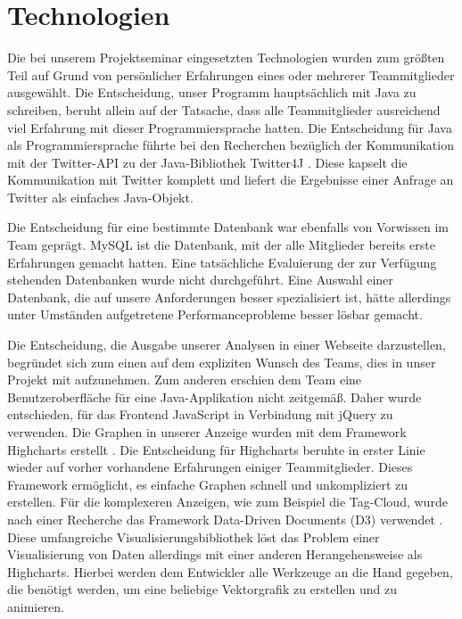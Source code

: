 \section{Technologien}
\label{sec:Tech}
Die bei unserem Projektseminar eingesetzten Technologien wurden zum größten Teil auf Grund von persönlicher Erfahrungen eines oder mehrerer Teammitglieder ausgewählt. Die Entscheidung, unser Programm hauptsächlich mit Java zu schreiben, beruht allein auf der Tatsache, dass alle Teammitglieder ausreichend viel Erfahrung mit dieser Programmiersprache hatten. Die Entscheidung für Java als Programmiersprache führte bei den Recherchen bezüglich der Kommunikation mit der Twitter-API zu der Java-Bibliothek Twitter4J \cite{Twitter4J}. Diese kapselt die Kommunikation mit Twitter komplett und liefert die Ergebnisse einer Anfrage an Twitter als einfaches Java-Objekt.

Die Entscheidung für eine bestimmte Datenbank war ebenfalls von Vorwissen im Team geprägt. MySQL ist die Datenbank, mit der alle Mitglieder bereits erste Erfahrungen gemacht hatten. Eine tatsächliche Evaluierung der zur Verfügung stehenden Datenbanken wurde nicht durchgeführt. Eine Auswahl einer Datenbank, die auf unsere Anforderungen besser spezialisiert ist, hätte allerdings unter Umständen aufgetretene Performanceprobleme besser lösbar gemacht.

Die Entscheidung, die Ausgabe unserer Analysen in einer Webseite darzustellen, begründet sich zum einen auf dem expliziten Wunsch des Teams, dies in unser Projekt mit aufzunehmen. Zum anderen erschien dem Team eine Benutzeroberfläche für eine Java-Applikation nicht zeitgemäß. Daher wurde entschieden, für das Frontend JavaScript in Verbindung mit jQuery \cite{jQuery} zu verwenden. Die Graphen in unserer Anzeige wurden mit dem Framework Highcharts erstellt \cite{Highcharts}. Die Entscheidung für Highcharts beruhte in erster Linie wieder auf vorher vorhandene Erfahrungen einiger Teammitglieder. Dieses Framework ermöglicht, es einfache Graphen schnell und unkompliziert zu erstellen. Für die komplexeren Anzeigen, wie zum Beispiel die Tag-Cloud, wurde nach einer Recherche das Framework Data-Driven Documents (D3) verwendet \cite{d3}. Diese umfangreiche Visualisierungsbibliothek löst das Problem einer Visualisierung von Daten allerdings mit einer anderen Herangehensweise als Highcharts. Hierbei werden dem Entwickler alle Werkzeuge an die Hand gegeben, die benötigt werden, um eine beliebige Vektorgrafik zu erstellen und zu animieren.
